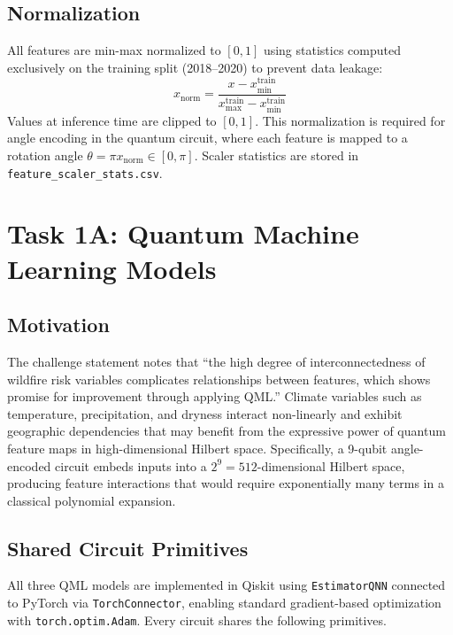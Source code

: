 \documentclass[11pt,a4paper]{article}
\begin{document}
\subsection{Normalization}

All features are min-max normalized to $[0, 1]$ using statistics computed
exclusively on the training split (2018--2020) to prevent data leakage:
\begin{equation}
    x_{\text{norm}} = \frac{x - x_{\min}^{\text{train}}}{x_{\max}^{\text{train}} - x_{\min}^{\text{train}}}
\end{equation}
Values at inference time are clipped to $[0, 1]$. This normalization is
required for angle encoding in the quantum circuit, where each feature
is mapped to a rotation angle $\theta = \pi x_{\text{norm}} \in [0, \pi]$.
Scaler statistics are stored in \texttt{feature\_scaler\_stats.csv}.

\section{Task 1A: Quantum Machine Learning Models}
\label{sec:qml}

\subsection{Motivation}
The challenge statement notes that ``the high degree of interconnectedness of
wildfire risk variables complicates relationships between features, which shows
promise for improvement through applying QML.'' Climate variables such as
temperature, precipitation, and dryness interact non-linearly and exhibit
geographic dependencies that may benefit from the expressive power of
quantum feature maps in high-dimensional Hilbert space. Specifically, a
9-qubit angle-encoded circuit embeds inputs into a $2^9 = 512$-dimensional
Hilbert space, producing feature interactions that would require exponentially
many terms in a classical polynomial expansion.

\subsection{Shared Circuit Primitives}

All three QML models are implemented in Qiskit using \texttt{EstimatorQNN}
connected to PyTorch via \texttt{TorchConnector}, enabling standard gradient-based
optimization with \texttt{torch.optim.Adam}. Every circuit shares the following
primitives.
\end{document}
